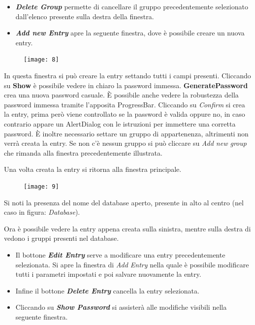 \documentclass[a4paper,12pt]{report}
\begin{document}
\begin{itemize}
    \item \textbf{\textit{Delete Group}} permette di cancellare il gruppo precedentemente selezionato dall’elenco presente sulla destra della finestra.
    \item \textbf{\textit{Add new Entry}} apre la seguente finestra, dove è possibile creare un nuova entry.
\end{itemize}

\clearpage
\begin{figure}[h]
\centering{}
\texttt{[image: 8]}
\end{figure}

In questa finestra si può creare la entry settando tutti i campi presenti. Cliccando su \textbf{Show} è possibile vedere in chiaro la password immessa. \textbf{GeneratePassword} crea una nuova password casuale. È possibile anche vedere la robustezza della password immessa tramite l’apposita ProgressBar.
Cliccando su \textit{Confirm} si crea la entry, prima però viene controllato se la password è valida oppure no, in caso contrario appare un AlertDialog con le istruzioni per immettere una corretta password. È inoltre necessario settare un gruppo di appartenenza, altrimenti non verrà creata la entry. Se non c’è nessun gruppo si può cliccare su \textit{Add new group} che rimanda alla finestra precedentemente illustrata.

Una volta creata la entry si ritorna alla finestra principale.

\clearpage
\begin{figure}[h]
\centering{}
\texttt{[image: 9]}
\end{figure}

Si noti la presenza del nome del database aperto, presente in alto al centro (nel caso in figura: \textit{Database}).

Ora è possibile vedere la entry appena creata sulla sinistra, mentre sulla destra di vedono i gruppi presenti nel database.

\begin{itemize}
    \item Il bottone \textbf{\textit{Edit Entry}} serve a modificare una entry precedentemente selezionata. Si apre la finestra di \textit{Add Entry} nella quale è possibile modificare tutti i parametri impostati e poi salvare nuovamente la entry.
    \item Infine il bottone \textbf{\textit{Delete Entry}} cancella la entry selezionata.
    \item Cliccando su \textbf{\textit{Show Password}} si assisterà alle modifiche visibili nella seguente finestra.
\end{itemize}
\end{document}
